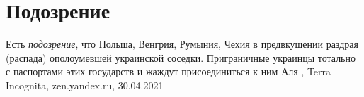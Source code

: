  
 
 
 
 
\chapter{Подозрение}

Есть \emph{подозрение}, что Польша, Венгрия, Румыния, Чехия в предвкушении
раздрая (распада) ополоумевшей украинской соседки. Приграничные украинцы
тотально с паспортами этих государств и жаждут присоединиться к ним
Аля
, 
Terra Incognita, zen.yandex.ru, 30.04.2021

